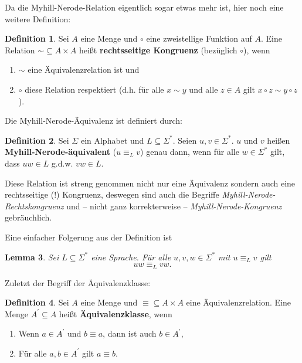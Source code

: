 \documentclass[11pt, a4paper]{article}
\theoremstyle{definition}
\newtheorem{definition}{Definition}
\theoremstyle{plain}
\newtheorem{lemma}[definition]{Lemma}
\begin{document}
Da die Myhill-Nerode-Relation eigentlich sogar etwas mehr ist, hier noch eine weitere Definition:
\begin{definition}
	Sei \( A \) eine Menge und \( \circ \) eine zweistellige Funktion auf \( A \). Eine Relation \( \sim \subseteq A \times A \) heißt \textbf{rechtsseitige Kongruenz} (bezüglich \( \circ \)), wenn
	\begin{enumerate}
		\item \( \sim \) eine Äquivalenzrelation ist und
		\item \( \circ \) diese Relation respektiert (d.h. für alle \( x \sim y \) und alle \( z \in A \) gilt \( x \circ z \sim y \circ z \)).
	\end{enumerate}
\end{definition}

Die Myhill-Nerode-Äquivalenz ist definiert durch:
\begin{definition}
	Sei \( \Sigma \) ein Alphabet und \( L \subseteq \Sigma^\ast \). Seien \( u, v \in \Sigma^\ast \). \( u \) und \( v \) heißen \textbf{Myhill-Nerode-äquivalent} (\( u \equiv_L v \)) genau dann, wenn für alle \( w \in \Sigma^\ast \) gilt, dass \( uw \in L \) g.d.w. \( vw \in L \).
\end{definition}

Diese Relation ist streng genommen nicht nur eine Äquivalenz sondern auch eine rechtsseitige (!) Kongruenz, deswegen sind auch die Begriffe \textit{Myhill-Nerode-Rechtskongruenz} und -- nicht ganz korrekterweise -- \textit{Myhill-Nerode-Kongruenz} gebräuchlich.

Eine einfacher Folgerung aus der Definition ist
\begin{lemma}\label{kongruenzlemma}
	Sei \( L \subseteq \Sigma^\ast \) eine Sprache. Für alle \( u, v, w \in \Sigma^\ast \) mit \( u \equiv_L v \) gilt
	\[
		uw \equiv_L vw.
	\]
\end{lemma}

Zuletzt der Begriff der Äquivalenzklasse:
\begin{definition}
	Sei \( A \) eine Menge und \( \equiv \subseteq A \times A \) eine Äquivalenzrelation. Eine Menge \( A^\prime \subseteq A \) heißt \textbf{Äquivalenzklasse}, wenn
	\begin{enumerate}
		\item Wenn \( a \in A^\prime \) und \( b \equiv a \), dann ist auch \( b \in A^\prime \),
		\item Für alle \( a, b \in A^\prime \) gilt \( a \equiv b \).
	\end{enumerate}
\end{definition}
\end{document}
